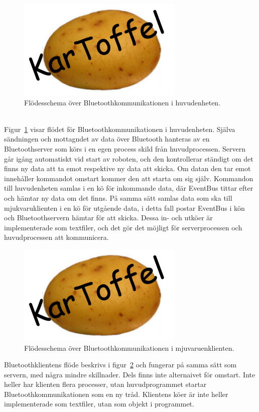 \documentclass{article}
\begin{document}
\begin{figure}[H]
\centering
\includegraphics[scale=0.45]{Logo}
\caption{Flödesschema över Bluetoothkommunikationen i huvudenheten.}
\label{fig:Kommunikation_huvudenhet_v2}
\end{figure}
\ \\

Figur~\ref{fig:Kommunikation_huvudenhet_v2} visar flödet för Bluetoothkommunikationen i huvudenheten. Själva sändningen och mottagndet av data över Bluetooth hanteras av en Bluetoothserver som körs i en egen process skild från huvudprocessen. Servern går igång automatiskt vid start av roboten, och den kontrollerar ständigt om det finns ny data att ta emot respektive ny data att skicka. Om datan den tar emot innehåller kommandot omstart kommer den att starta om sig själv. Kommandon till huvudenheten samlas i en kö för inkommande data, där EventBus tittar efter och hämtar ny data om det finns. På samma sätt samlas data som ska till mjukvaruklienten i en kö för utgående data, i detta fall postar EventBus i kön och Bluetoothservern hämtar för att skicka. Dessa in- och utköer är implementerade som textfiler, och det gör det möjligt för serverprocessen och huvudprocessen att kommunicera.

\begin{figure}[H]
\centering
\includegraphics[scale=0.45]{Logo}
\caption{Flödesschema över Bluetoothkommunikationen i mjuvaruenklienten.}
\label{fig:Kommunikation_mjukvaruklient_v2}
\end{figure}

Bluetoothklientens flöde beskrivs i figur~\ref{fig:Kommunikation_mjukvaruklient_v2} och fungerar på samma sätt som servern, med några mindre skillnader. Dels finns inte alternaivet för omstart. Inte heller har klienten flera processer, utan huvudprogrammet startar Bluetoothkommunikationen som en ny tråd. Klientens köer är inte heller implementerade som textfiler, utan som objekt i programmet.
\end{document}
